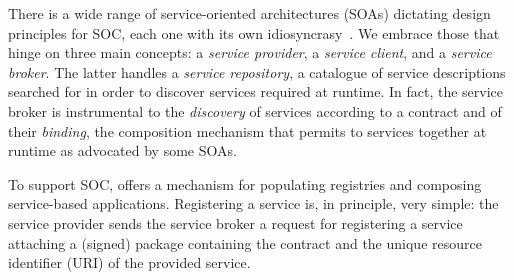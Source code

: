 %
There is a wide range of service-oriented
architectures (SOAs) dictating design principles for SOC, each one
with its own
idiosyncrasy~\cite{mulesoft:soa,ibm:soa,microsoft:soa,oracle:soa}.
%
We embrace those that hinge on three main concepts: a \emph{service
  provider}, a \emph{service client}, and a \emph{service broker}.
%
The latter handles a \emph{service repository}, a catalogue of service
descriptions searched for in order to discover services required at
runtime.
%
In fact, the service broker is instrumental to the \emph{discovery} of
services according to a contract and of their \emph{binding}, the
composition mechanism that permits to  services together at
runtime as advocated by some SOAs.

To support SOC, \SEArch offers a mechanism for populating registries
and composing service-based applications.
%
Registering a service is, in principle, very simple: the service
provider sends the service broker a request for registering a service
attaching a (signed) package containing the contract and the unique
resource identifier (URI) of the provided service.

%
%

